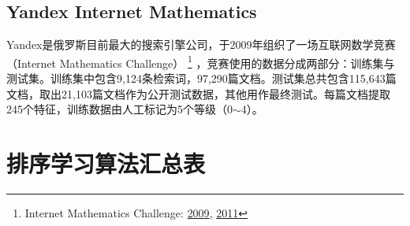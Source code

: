 \subsection{Yandex Internet Mathematics}
Yandex是俄罗斯目前最大的搜索引擎公司，于2009年组织了一场互联网数学竞赛（Internet Mathematics Challenge）
\footnote{Internet Mathematics Challenge: \href{http://imat2009.yandex.ru/en}{2009}, \href{http://imat-relpred.yandex.ru/en}{2011}}
，竞赛使用的数据分成两部分：训练集与测试集。训练集中包含9,124条检索词，97,290篇文档。测试集总共包含115,643篇文档，取出21,103篇文档作为公开测试数据，其他用作最终测试。每篇文档提取245个特征，训练数据由人工标记为5个等级（0$\sim$4）。


\section{排序学习算法汇总表}

